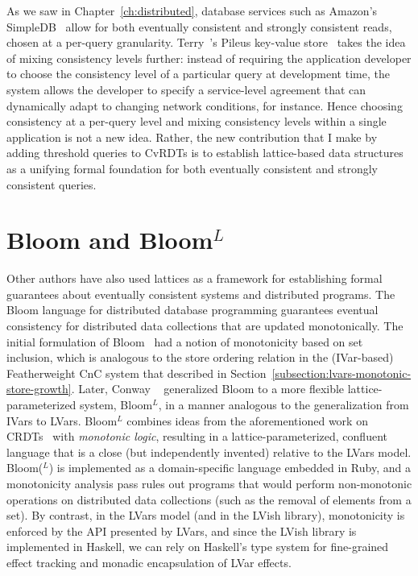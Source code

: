 As we saw in Chapter~\ref{ch:distributed}, database services such as
Amazon's SimpleDB~\cite{simpledb-vogels-article} allow for both
eventually consistent and strongly consistent reads, chosen at a
per-query granularity.  Terry~\etal's Pileus key-value
store~\cite{pileus} takes the idea of mixing consistency levels
further: instead of requiring the application developer to choose the
consistency level of a particular query at development time, the
system allows the developer to specify a service-level agreement that
can dynamically adapt to changing network conditions, for instance.
Hence choosing consistency at a per-query level and mixing consistency
levels within a single application is not a new idea.  Rather, the new
contribution that I make by adding threshold queries to CvRDTs is to
establish lattice-based data structures as a unifying formal
foundation for both eventually consistent and strongly consistent
queries.
\fi

\section{Bloom and Bloom$^L$}

Other authors have also used lattices as a framework for establishing
formal guarantees about eventually consistent systems and distributed
programs.  The Bloom language for distributed database programming
guarantees eventual consistency for distributed data collections that
are updated monotonically.  The initial formulation of
Bloom~\cite{bloom-cidr} had a notion of monotonicity based on set
inclusion, which is analogous to the store ordering relation in the
(IVar-based) Featherweight CnC system that  described in
Section~\ref{subsection:lvars-monotonic-store-growth}.  Later, Conway
\etal~ generalized Bloom to a more flexible
lattice-parameterized system, Bloom$^L$, in a manner analogous to the
generalization from IVars to LVars.  Bloom$^L$ combines ideas from the
aforementioned work on CRDTs~\cite{crdts, crdts-tr} with
\emph{monotonic logic}, resulting in a lattice-parameterized,
confluent language that is a close (but independently invented)
relative to the LVars model.  Bloom($^L$) is implemented as a
domain-specific language embedded in Ruby, and a monotonicity analysis
pass rules out programs that would perform non-monotonic operations on
distributed data collections (such as the removal of elements from a
set).  By contrast, in the LVars model (and in the LVish library),
monotonicity is enforced by the API presented by LVars, and since the
LVish library is implemented in Haskell, we can rely on Haskell's type
system for fine-grained effect tracking and monadic encapsulation of
LVar effects.

